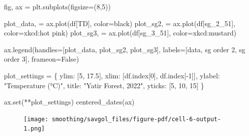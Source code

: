\documentclass[
  letterpaper,
  DIV=11,
  numbers=noendperiod,
  oneside]{scrreprt}
\newenvironment{Shaded}{\begin{snugshade}}{\end{snugshade}}
\newcommand{\BuiltInTok}[1]{\textcolor[rgb]{0.00,0.23,0.31}{#1}}
\newcommand{\DecValTok}[1]{\textcolor[rgb]{0.68,0.00,0.00}{#1}}
\newcommand{\FloatTok}[1]{\textcolor[rgb]{0.68,0.00,0.00}{#1}}
\newcommand{\NormalTok}[1]{\textcolor[rgb]{0.00,0.23,0.31}{#1}}
\newcommand{\OperatorTok}[1]{\textcolor[rgb]{0.37,0.37,0.37}{#1}}
\newcommand{\StringTok}[1]{\textcolor[rgb]{0.13,0.47,0.30}{#1}}
\newcommand{\VariableTok}[1]{\textcolor[rgb]{0.07,0.07,0.07}{#1}}
\begin{document}
\begin{Shaded}
\begin{Highlighting}[]
\NormalTok{fig, ax }\OperatorTok{=}\NormalTok{ plt.subplots(figsize}\OperatorTok{=}\NormalTok{(}\DecValTok{8}\NormalTok{,}\DecValTok{5}\NormalTok{))}

\NormalTok{plot\_data, }\OperatorTok{=}\NormalTok{ ax.plot(df[}\StringTok{\textquotesingle{}TD\textquotesingle{}}\NormalTok{], color}\OperatorTok{=}\StringTok{\textquotesingle{}black\textquotesingle{}}\NormalTok{)}
\NormalTok{plot\_sg2, }\OperatorTok{=}\NormalTok{ ax.plot(df[}\StringTok{\textquotesingle{}sg\_2\_51\textquotesingle{}}\NormalTok{], color}\OperatorTok{=}\StringTok{\textquotesingle{}xkcd:hot pink\textquotesingle{}}\NormalTok{)}
\NormalTok{plot\_sg3, }\OperatorTok{=}\NormalTok{ ax.plot(df[}\StringTok{\textquotesingle{}sg\_3\_51\textquotesingle{}}\NormalTok{], color}\OperatorTok{=}\StringTok{\textquotesingle{}xkcd:mustard\textquotesingle{}}\NormalTok{)}

\NormalTok{ax.legend(handles}\OperatorTok{=}\NormalTok{[plot\_data, plot\_sg2, plot\_sg3],}
\NormalTok{          labels}\OperatorTok{=}\NormalTok{[}\StringTok{\textquotesingle{}data\textquotesingle{}}\NormalTok{, }\StringTok{\textquotesingle{}sg order 2\textquotesingle{}}\NormalTok{, }\StringTok{\textquotesingle{}sg order 3\textquotesingle{}}\NormalTok{],}
\NormalTok{          frameon}\OperatorTok{=}\VariableTok{False}\NormalTok{)}

\NormalTok{plot\_settings }\OperatorTok{=}\NormalTok{ \{}
    \StringTok{\textquotesingle{}ylim\textquotesingle{}}\NormalTok{: [}\DecValTok{5}\NormalTok{, }\FloatTok{17.5}\NormalTok{],}
    \StringTok{\textquotesingle{}xlim\textquotesingle{}}\NormalTok{: [df.index[}\DecValTok{0}\NormalTok{], df.index[}\OperatorTok{{-}}\DecValTok{1}\NormalTok{]],}
    \StringTok{\textquotesingle{}ylabel\textquotesingle{}}\NormalTok{: }\StringTok{"Temperature (°C)"}\NormalTok{,}
    \StringTok{\textquotesingle{}title\textquotesingle{}}\NormalTok{: }\StringTok{"Yatir Forest, 2022"}\NormalTok{,}
    \StringTok{\textquotesingle{}yticks\textquotesingle{}}\NormalTok{: [}\DecValTok{5}\NormalTok{, }\DecValTok{10}\NormalTok{, }\DecValTok{15}\NormalTok{]}
\NormalTok{\}}

\NormalTok{ax.}\BuiltInTok{set}\NormalTok{(}\OperatorTok{**}\NormalTok{plot\_settings)}
\NormalTok{centered\_dates(ax)}
\end{Highlighting}
\end{Shaded}

\begin{figure}[H]

{\centering \texttt{[image: smoothing/savgol\_files/figure-pdf/cell-6-output-1.png]}

}

\end{figure}
\end{document}
